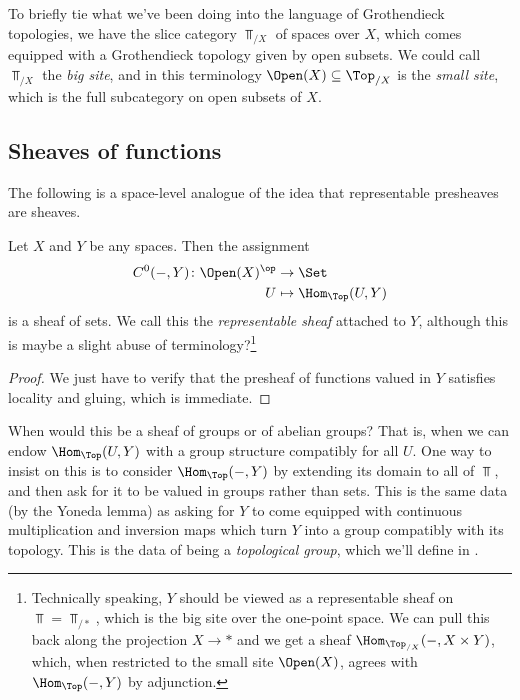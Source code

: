 \documentclass[11pt]{book}
\begin{document}
To briefly tie what we've been doing into the language of Grothendieck topologies, we have the slice category $\Top_{/X}$ of spaces over $X$, which comes equipped with a Grothendieck topology given by open subsets. We could call $\Top_{/X}$ the \emph{big site}, and in this terminology $\Open(X) \subseteq \Top_{/X}$ is the \emph{small site}, which is the full subcategory on open subsets of $X$.

\subsection{Sheaves of functions} The following is a space-level analogue of the idea that representable presheaves are sheaves.

\begin{example}
\label{exa:representable-sheaves}
Let $X$ and $Y$ be any spaces. Then the assignment
\begin{align*}
    C^0(-,Y) \colon \Open(X)^\op &\to \Set \\
    U &\mapsto \Hom_\Top(U,Y)
\end{align*}
is a sheaf of sets. We call this the \emph{representable sheaf} attached to $Y$, although this is maybe a slight abuse of terminology?\footnote{Technically speaking, $Y$ should be viewed as a representable sheaf on $\Top = \Top_{/\ast}$, which is the big site over the one-point space. We can pull this back along the projection $X \to \ast$ and we get a sheaf $\Hom_{\Top_{/X}}(-,X \times Y)$, which, when restricted to the small site $\Open(X)$, agrees with $\Hom_{\Top}(-,Y)$ by adjunction.}
\end{example}
\begin{proof} We just have to verify that the presheaf of functions valued in $Y$ satisfies locality and gluing, which is immediate.
\end{proof}

\begin{question} When would this be a sheaf of groups or of abelian groups? That is, when we can endow $\Hom_\Top(U,Y)$ with a group structure compatibly for all $U$. One way to insist on this is to consider $\Hom_\Top(-,Y)$ by extending its domain to all of $\Top$, and then ask for it to be valued in groups rather than sets. This is the same data (by the Yoneda lemma) as asking for $Y$ to come equipped with continuous multiplication and inversion maps which turn $Y$ into a group compatibly with its topology. This is the data of being a \emph{topological group}, which we'll define in .
\end{question}
\end{document}
